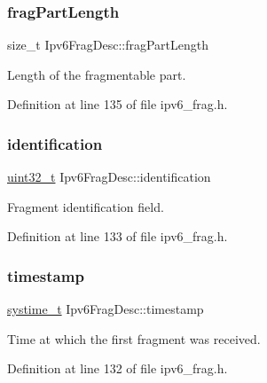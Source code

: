 \subsubsection{\texorpdfstring{frag\+Part\+Length}{fragPartLength}}
{\footnotesize\ttfamily size\+\_\+t Ipv6\+Frag\+Desc\+::frag\+Part\+Length}



Length of the fragmentable part. 



Definition at line 135 of file ipv6\+\_\+frag.\+h.

\mbox{\label{structIpv6FragDesc_a2c2575ed800af0856ec9f0db94039158}} 
\subsubsection{\texorpdfstring{identification}{identification}}
{\footnotesize\ttfamily \hyperlink{stdint_8h_a435d1572bf3f880d55459d9805097f62}{uint32\+\_\+t} Ipv6\+Frag\+Desc\+::identification}



Fragment identification field. 



Definition at line 133 of file ipv6\+\_\+frag.\+h.

\mbox{\label{structIpv6FragDesc_ab6e5ead9ee6cc2e4e026b6aef89d76a1}} 
\subsubsection{\texorpdfstring{timestamp}{timestamp}}
{\footnotesize\ttfamily \hyperlink{compiler__port_8h_ae3e32a98d431a02106616da3071832dd}{systime\+\_\+t} Ipv6\+Frag\+Desc\+::timestamp}



Time at which the first fragment was received. 



Definition at line 132 of file ipv6\+\_\+frag.\+h.

\mbox{\label{structIpv6FragDesc_a8304cd1b608d13d100617e40f170a079}} 

